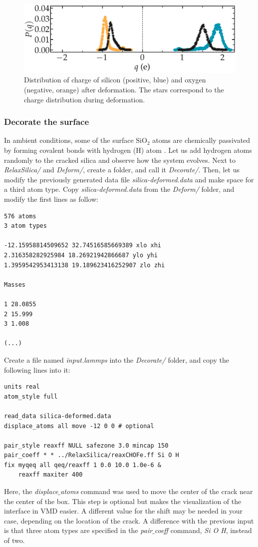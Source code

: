 \documentclass[9pt,tutorial]{livecoms}
\begin{document}
\begin{figure}
\includegraphics[width=\linewidth]{SIO-distribution-bis}
\caption{Distribution of charge of silicon (positive, blue) and oxygen (negative, orange) after deformation. The stars correspond to the charge distribution during deformation.}
\label{fig:SIO-distribution-bis}
\end{figure}

\subsubsection{Decorate the surface}
In ambient conditions, some of the surface $\text{SiO}_2$ atoms are chemically
passivated by forming covalent bonds with hydrogen (H) atom \cite{sulpizi2012silica}. Let us add hydrogen atoms randomly to the cracked silica and observe how the system evolves.  Next to \textit{RelaxSilica/} and \textit{Deform/}, create a folder, and call it \textit{Decorate/}. Then, let us modify the previously generated data file \textit{silica-deformed.data} and make space for a third atom type. Copy \textit{silica-deformed.data} from the \textit{Deform/} folder, and modify the first lines as follow:
{\normalsize \begin{verbatim}
576 atoms
3 atom types

-12.15958814509652 32.74516585669389 xlo xhi
2.316358282925984 18.26921942866687 ylo yhi
1.3959542953413138 19.189623416252907 zlo zhi

Masses

1 28.0855
2 15.999
3 1.008

(...)
\end{verbatim}}
Create a file named \textit{input.lammps} into the \textit{Decorate/} folder, and copy the following lines into it:
{\normalsize \begin{verbatim}
units real
atom_style full

read_data silica-deformed.data
displace_atoms all move -12 0 0 # optional

pair_style reaxff NULL safezone 3.0 mincap 150
pair_coeff * * ../RelaxSilica/reaxCHOFe.ff Si O H
fix myqeq all qeq/reaxff 1 0.0 10.0 1.0e-6 &
    reaxff maxiter 400
\end{verbatim}}
Here, the \textit{displace$\_$atoms} command was used to move the center of the crack near the center of the box. This step is optional but makes the visualization of the interface in VMD easier. A different value for the shift may be needed in your case, depending on the location of the crack. A difference with the previous input is that three atom types are specified
in the \textit{pair$\_$coeff} command, \textit{Si O H}, instead of two.
\end{document}

